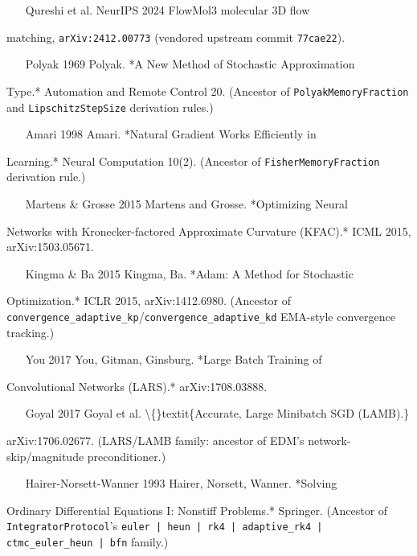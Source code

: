 \documentclass[preprint,3p,times,twocolumn]{elsarticle}
\begin{document}
\begin{itemize}
\item [Qureshi et al. NeurIPS 2024] FlowMol3  molecular 3D flow
\end{itemize}
matching, \texttt{arXiv:2412.00773} (vendored upstream commit \texttt{77cae22}).

\begin{itemize}
\item [Polyak 1969] Polyak. *A New Method of Stochastic Approximation
\end{itemize}
Type.* Automation and Remote Control 20. (Ancestor of \texttt{PolyakMemoryFraction} and \texttt{LipschitzStepSize} derivation rules.)

\begin{itemize}
\item [Amari 1998] Amari. *Natural Gradient Works Efficiently in
\end{itemize}
Learning.* Neural Computation 10(2). (Ancestor of \texttt{FisherMemoryFraction} derivation rule.)

\begin{itemize}
\item [Martens \& Grosse 2015] Martens and Grosse. *Optimizing Neural
\end{itemize}
Networks with Kronecker-factored Approximate Curvature (KFAC).* ICML 2015, arXiv:1503.05671.

\begin{itemize}
\item [Kingma \& Ba 2015] Kingma, Ba. *Adam: A Method for Stochastic
\end{itemize}
Optimization.* ICLR 2015, arXiv:1412.6980. (Ancestor of \texttt{convergence\_adaptive\_kp}/\texttt{convergence\_adaptive\_kd} EMA-style convergence tracking.)

\begin{itemize}
\item [You 2017] You, Gitman, Ginsburg. *Large Batch Training of
\end{itemize}
Convolutional Networks (LARS).* arXiv:1708.03888.

\begin{itemize}
\item [Goyal 2017] Goyal et al. \textbackslash\{\}textit\{Accurate, Large Minibatch SGD (LAMB).\}
\end{itemize}
arXiv:1706.02677. (LARS/LAMB family: ancestor of EDM's network- skip/magnitude preconditioner.)

\begin{itemize}
\item [Hairer-Norsett-Wanner 1993] Hairer, Norsett, Wanner. *Solving
\end{itemize}
Ordinary Differential Equations I: Nonstiff Problems.* Springer. (Ancestor of \texttt{IntegratorProtocol}'s \texttt{euler | heun | rk4 | adaptive\_rk4 | ctmc\_euler\_heun | bfn} family.)
\end{document}
